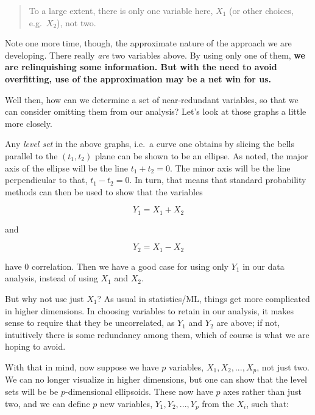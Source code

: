 \begin{quote}

To a large extent, there is only one variable here, $X_1$ (or other
choices, e.g.\ $X_2$), not two.  

\end{quote}

Note one more time, though, the approximate nature of the approach we
are developing.  There really \textit{are} two variables above.  By
using only one of them, \textbf{we are relinquishing some information.  But with
the need to avoid overfitting, use of the approximation may be a net win
for us.}

Well then, how can we determine a set of near-redundant variables, so
that we can consider omitting them from our analysis?  Let's look at
those graphs a little more closely.

Any \textit{level set} in the above graphs, i.e.\ a curve one
obtains by slicing the bells parallel to the $(t_1,t_2)$ plane can be
shown to be an ellipse.  As noted, the major axis of the ellipse will be
the line $t_1 + t_2 = 0$.  The minor axis will be the line perpendicular
to that, $t_1 - t_2 = 0$.  In turn, that means that standard probability
methods can then be used to show that the variables

\begin{equation}
Y_1 = X_1 + X_2 
\end{equation}

and 

\begin{equation}
Y_2 = X_1 - X_2 
\end{equation}

have 0 correlation.  Then we have a good case for using only $Y_1$ in
our data analysis, instead of using $X_1$ and $X_2$.  

But why not use just $X_1$?  As usual in statistics/ML, things get more
complicated in higher dimensions.  In choosing variables to retain in
our analysis, it makes sense to require that they be uncorrelated, as
$Y_1$ and $Y_2$ are above; if not, intuitively there is some redundancy
among them, which of course is what we are hoping to avoid.  

With that in mind, now suppose we have $p$ variables, $X_1,
X_2,...,X_p$, not just two.  We can no longer visualize in higher
dimensions, but one can show that the level sets will be be
$p$-dimensional ellipsoids.  These now have $p$ axes rather than just
two, and we can define $p$ new variables, $Y_1,Y_2,...,Y_p$ from the
$X_i$, such that:

